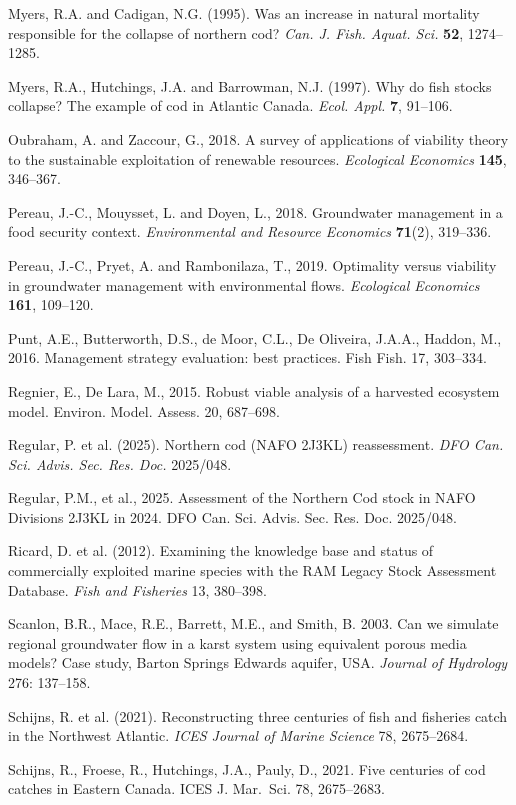 \documentclass[11pt]{article}
\begin{document}
Myers, R.A. and Cadigan, N.G. (1995). Was an increase in natural mortality responsible for
the collapse of northern cod? \emph{Can. J. Fish. Aquat. Sci.} \textbf{52}, 1274--1285.

Myers, R.A., Hutchings, J.A. and Barrowman, N.J. (1997). Why do fish stocks collapse? The
example of cod in Atlantic Canada. \emph{Ecol. Appl.} \textbf{7}, 91--106.

Oubraham, A. and Zaccour, G., 2018. A survey of applications of viability theory to the
sustainable exploitation of renewable resources. \emph{Ecological Economics} \textbf{145},
346--367.

Pereau, J.-C., Mouysset, L. and Doyen, L., 2018. Groundwater management in a food security
context. \emph{Environmental and Resource Economics} \textbf{71}(2), 319--336.

Pereau, J.-C., Pryet, A. and Rambonilaza, T., 2019. Optimality versus viability in groundwater
management with environmental flows. \emph{Ecological Economics} \textbf{161}, 109--120.

Punt, A.E., Butterworth, D.S., de Moor, C.L., De Oliveira, J.A.A., Haddon, M., 2016.
Management strategy evaluation: best practices. Fish Fish. 17, 303--334.

Regnier, E., De Lara, M., 2015. Robust viable analysis of a harvested ecosystem model.
Environ. Model. Assess. 20, 687--698.

Regular, P. et al. (2025). Northern cod (NAFO 2J3KL) reassessment.
\emph{DFO Can. Sci. Advis. Sec. Res. Doc.} 2025/048.

Regular, P.M., et al., 2025. Assessment of the Northern Cod stock in
NAFO Divisions 2J3KL in 2024. DFO Can. Sci. Advis. Sec. Res. Doc.
2025/048.

Ricard, D. et al. (2012). Examining the knowledge base and status of
commercially exploited marine species with the RAM Legacy Stock
Assessment Database. \emph{Fish and Fisheries} 13, 380--398.

Scanlon, B.R., Mace, R.E., Barrett, M.E., and Smith, B. 2003. Can we
simulate regional groundwater flow in a karst system using equivalent
porous media models? Case study, Barton Springs Edwards aquifer, USA.
\emph{Journal of Hydrology} 276: 137--158.

Schijns, R. et al. (2021). Reconstructing three centuries of fish and
fisheries catch in the Northwest Atlantic. \emph{ICES Journal of Marine
Science} 78, 2675--2684.

Schijns, R., Froese, R., Hutchings, J.A., Pauly, D., 2021.
Five centuries of cod catches in Eastern Canada. ICES J. Mar.~Sci. 78,
2675--2683.
\end{document}
